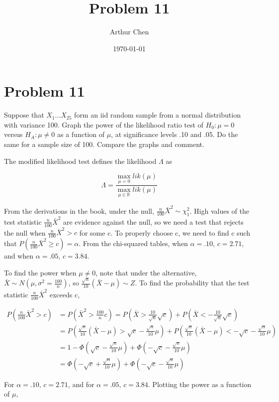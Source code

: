 \documentclass{article}
\author{Arthur Chen}
\title{Problem 11}
\date{\today}
\begin{document}
\section*{Problem 11}

Suppose that $X_1 \dots X_{25}$ form an iid random sample from a normal distribution with variance 100. Graph the power of the likelihood ratio test of $H_{0}: \mu = 0$ versus $H_{A}: \mu \neq 0$ as a function of $\mu$, at significance levels .10 and .05. Do the same for a sample size of 100. Compare the graphs and comment.

The modified likelihood test defines the likelihood $\Lambda$ as

\[
\Lambda = \frac{\max_{\mu = 0} lik(\mu)}
{\max_{\mu \in \mathbb{R}} lik(\mu)}
\]

From the derivations in the book, under the null, $\frac{n}{100} \bar{X}^2 \sim \chi_1^2$. High values of the test statistic $\frac{n}{100} \bar{X}^2$ are evidence against the null, so we need a test that rejects the null when $\frac{n}{100} \bar{X}^2 > c$ for some c. To properly choose c, we need to find c such that $P(\frac{n}{100}\bar{X}^2 \geq c) = \alpha$. From the chi-squared tables, when $\alpha = .10$, $c = 2.71$, and when $\alpha = .05$, $c = 3.84$.

To find the power when $\mu \neq 0$, note that under the alternative, $\bar{X} \sim N(\mu, \sigma^2 = \frac{100}{n})$, so $\frac{\sqrt{n}}{10}(\bar{X} - \mu) \sim Z$. To find the probability that the test statistic $\frac{n}{100} \bar{X}^2$ exceeds c,

\begin{align*}
P\left(\frac{n}{100}\bar{X}^2 > c\right) &= P\left(\bar{X}^2 > \frac{100}{n}c\right) = P\left(\bar{X} > \frac{10}{\sqrt{n}}\sqrt{c}\right) + P\left(\bar{X} < -\frac{10}{\sqrt{n}} \sqrt{c}\right) \\
&= P\left(\frac{\sqrt{n}}{10}(\bar{X} - \mu) > \sqrt{c} - \frac{\sqrt{n}}{10}\mu\right) + P\left(\frac{\sqrt{n}}{10}(\bar{X} - \mu) < -\sqrt{c} - \frac{\sqrt{n}}{10}\mu\right) \\
&= 1 - \Phi\left(\sqrt{c} - \frac{\sqrt{n}}{10}\mu \right) + \Phi\left(-\sqrt{c} - \frac{\sqrt{n}}{10}\mu \right) \\
&= \Phi\left(-\sqrt{c} + \frac{\sqrt{n}}{10}\mu \right) + \Phi\left(-\sqrt{c} - \frac{\sqrt{n}}{10}\mu \right)
\end{align*}

For $\alpha = .10$, $c = 2.71$, and for $\alpha = .05$, $c = 3.84$. Plotting the power as a function of $\mu$,
\end{document}
